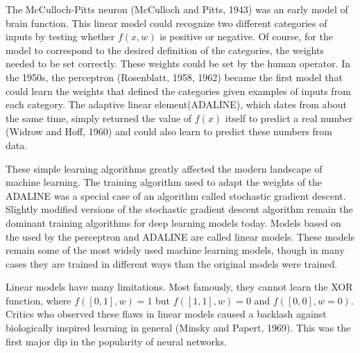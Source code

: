 \documentclass[11pt]{article}
\begin{document}
The McCulloch-Pitts neuron (McCulloch and Pitts, 1943) was an early model of brain function.
This linear model could recognize two different categories of inputs by testing whether $f(x,w)$ is positive or negative.
Of course, for the model to correspond to the desired definition of the categories, the weights needed to be set correctly.
These weights could be set by the human operator.
In the 1950s, the perceptron (Rosenblatt, 1958, 1962) became the first model that could learn the weights that defined the categories given examples of inputs from each category.
The adaptive linear element(ADALINE), which dates from about the same time, simply returned the value of $f(x)$ itself to predict a real number (Widrow and Hoff, 1960) and could also learn to predict these numbers from data.

These simple learning algorithms greatly affected the modern landscape of machine learning.
The training algorithm used to adapt the weights of the ADALINE was a special case of an algorithm called stochastic gradient descent.
Slightly modified versions of the stochastic gradient descent algorithm remain the dominant training algorithms for deep learning models today.
Models based on the used by the perceptron and ADALINE are called linear models.
These models remain some of the most widely used machine learning models, though in many cases they are trained in different ways than the original models were trained.

Linear models have many limitations.
Most famously, they cannot learn the XOR function, where $f([0,1],w) = 1$ but $f([1,1],w)=0$ and $f([0,0],w=0)$.
Critics who observed these ﬂaws in linear models caused a backlash against biologically inspired learning in general (Minsky and Papert, 1969).
This was the ﬁrst major dip in the popularity of neural networks.
\end{document}
